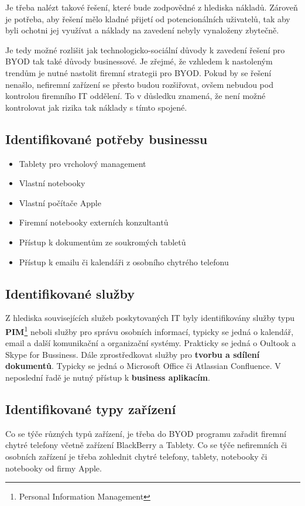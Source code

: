 Je třeba nalézt takové řešení, které bude zodpovědné z hlediska nákladů. Zároveň je potřeba, aby řešení mělo kladné přijetí od potencionálních uživatelů, tak aby byli ochotni jej využívat a náklady na zavedení nebyly vynaloženy zbytečně.  

Je tedy možné rozlišit jak technologicko-sociální důvody k zavedení řešení pro BYOD tak také důvody businessové. Je zřejmé, že vzhledem k nastoleným trendům je nutné nastolit firemní strategii pro BYOD. Pokud by se řešení nenašlo, nefiremní zařízení se přesto budou rozšiřovat, ovšem nebudou pod kontrolou firemního IT oddělení. To v důsledku znamená, že není možné kontrolovat jak rizika tak náklady s tímto spojené. 


\subsection{Identifikované potřeby businessu}
\begin{itemize}
    \item Tablety pro vrcholový management
    \item Vlastní notebooky
    \item Vlastní počítače Apple
    \item Firemní notebooky externích konzultantů
    \item Přístup k dokumentům ze soukromých tabletů
    \item Přístup k emailu či kalendáři z osobního chytrého telefonu
\end{itemize}

\subsection{Identifikované služby}
Z hlediska souvisejících služeb poskytovaných IT byly identifikovány služby typu \textbf{PIM}\footnote{Personal Information Management} neboli služby pro správu osobních informací, typicky se jedná o kalendář, email a další komunikační a organizační systémy. Prakticky se jedná o Oultook a Skype for Bussiness. Dále zprostředkovat služby pro \textbf{tvorbu a sdílení dokumentů}. Typicky se jedná o Microsoft Office či Atlassian Confluence. V neposlední řadě je nutný přístup k \textbf{business aplikacím}.

\subsection{Identifikované typy zařízení}
Co se týče různých typů zařízení, je třeba do BYOD programu zařadit firemní chytré telefony včetně zařízení BlackBerry a Tablety. Co se týče nefiremních či osobních zařízení je třeba zohlednit chytré telefony, tablety, notebooky či notebooky od firmy Apple.

